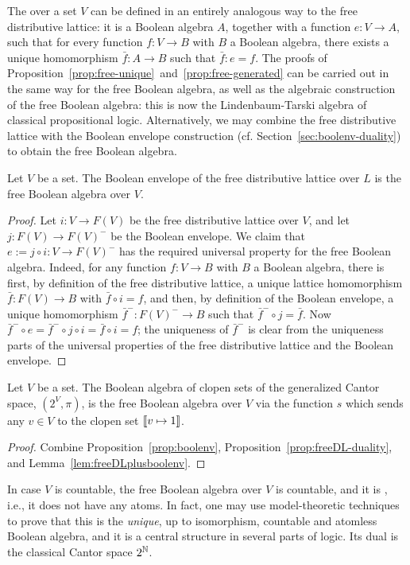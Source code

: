   
  The  over a set $V$ can be defined in an entirely analogous way to the free distributive lattice: it is a Boolean algebra $A$, together with a function $e \colon V \to A$, such that for every function $f \colon V \to B$ with $B$ a Boolean algebra, there exists a unique homomorphism $\bar{f} \colon A \to B$ such that $\bar{f} \colon e = f$. The proofs of Proposition~\ref{prop:free-unique}~and~\ref{prop:free-generated} can be carried out in the same way for the free Boolean algebra, as well as the algebraic construction of the free Boolean algebra: this is now the Lindenbaum-Tarski algebra of classical propositional logic. Alternatively, we may combine the free distributive lattice with the Boolean envelope construction (cf. Section~\ref{sec:boolenv-duality}) to obtain the free Boolean algebra.
  \begin{lemma}\label{lem:freeDLplusboolenv}
    Let $V$ be a set. The Boolean envelope of the free distributive lattice over $L$ is the free Boolean algebra over $V$.
  \end{lemma}
  \begin{proof}
    Let $i \colon V \to F(V)$ be the free distributive lattice over $V$, and let $j \colon F(V) \to F(V)^-$ be the Boolean envelope. We claim that $e := j \circ i \colon V \to F(V)^-$ has the required universal property for the free Boolean algebra. Indeed, for any function $f \colon V \to B$ with $B$ a Boolean algebra, there is first, by definition of the free distributive lattice, a unique lattice homomorphism $\bar{f} \colon F(V) \to B$ with $\bar{f} \circ i = f$, and then, by definition of the Boolean envelope, a unique homomorphism $\bar{f}^- \colon F(V)^- \to B$ such that $\bar{f}^- \circ j = \bar{f}$. Now $\bar{f}^- \circ e = \bar{f}^- \circ j \circ i = \bar{f} \circ i = f$; the uniqueness of $\bar{f}^-$ is clear from the uniqueness parts of the universal properties of the free distributive lattice and the Boolean envelope.
  \end{proof}
  \begin{corollary}\label{cor:freeBA-duality}
  Let $V$ be a set. The Boolean algebra of clopen sets of the generalized Cantor space, $(2^V, \pi)$, is the free Boolean algebra over $V$ via the function $s$ which sends any $v \in V$ to the clopen set $\llbracket {v \mapsto 1} \rrbracket$.
  \end{corollary}
  \begin{proof}
    Combine Proposition~\ref{prop:boolenv}, Proposition~\ref{prop:freeDL-duality}, and Lemma~\ref{lem:freeDLplusboolenv}.
  \end{proof}
In case $V$ is countable, the free Boolean algebra over $V$ is countable, and  it is , i.e., it does not have any atoms. In fact, one may use model-theoretic techniques to prove that this is the \emph{unique}, up to isomorphism, countable and atomless Boolean algebra, and it is a central structure in several parts of logic. Its dual is the classical Cantor space $2^{\mathbb{N}}$.
\exercises

